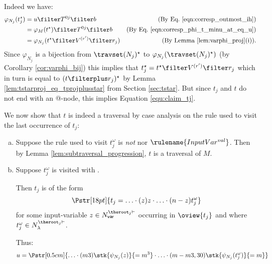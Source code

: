 \begin{itemize}[$\bullet$]
\begin{enumerate}
\begin{itemize}
        Indeed we have:
        \begin{align*}
        \varphi_{N_j}(t_j^\star) &= u \filter T^{0j}\filter b
            & \mbox{(By Eq.\ \ref{eqn:corresp_outmost_ih})} \\
         &= \varphi_{M}(t^\star) \filter T^{0j}\filter b
            & \mbox{(By Eq.\ \ref{eqn:corresp_phi_t_minu_at_eq_u})} \\
         &= \varphi_{N_j}(t^\star \filter V^{(r')} \filter r_j )
            & \mbox{(By Lemma \ref{lem:varphi_proj}(i)).}
        \end{align*}
        Since $\varphi_{N_j}$ is a bijection from  $\travset(N_j)^\star$ to $\varphi_{N_j}(\travset(N_j)^\star )$ (by Corollary \ref{cor:varphi_bij}) this implies that  $t_j^\star = t^\star \filter V^{(r')} \filter r_j$ which in turn is equal to $(t\filterplus r_j)^\star$ by Lemma \ref{lem:tstarproj_eq_tprojplusstar} from Section \ref{sec:tstar}. But since $t_j$ and $t$ do not end with an @-node, this implies Equation \ref{equ:claim_tj}.
    \smallskip

    We now show that $t$ is indeed a traversal by case analysis on the rule used to visit the last occurrence of $t_j$:
    \begin{enumerate}[(a)]
    \item  Suppose the rule used to visit $t_j^\omega$ is \emph{not}  nor $\rulename{InputVar^{val}}$.
        Then by Lemma \ref{lem:subtraversal_progression}, $t$ is a traversal of $M$.

    \item Suppose $t_j^\omega$ is visited with .

        Then $t_j$ is of the form
        $$\Pstr[18pt]{ t_j = \ldots \cdot (z)z \cdot \ldots \cdot (n-z){t_j^\omega}}$$
        for some input-variable $z \in
        N^{\theroot_j\vdash}_{\sf var}$ occurring in
        $\oview{t_j}$ and where $t_j^\omega \in N_\lambda^{\theroot_j\vdash}$.


        Thus:
        $$u = \Pstr[0.5cm]{ \ldots \cdot (m3){\stk{\psi_{N_j}(z)}{=m^3}} \cdot
                    \ldots \cdot (m-m3,30){\stk{\psi_{N_j}(t_j^\omega)}{=m}} } $$




\end{enumerate}
\end{itemize}
\end{enumerate}
\end{itemize}
